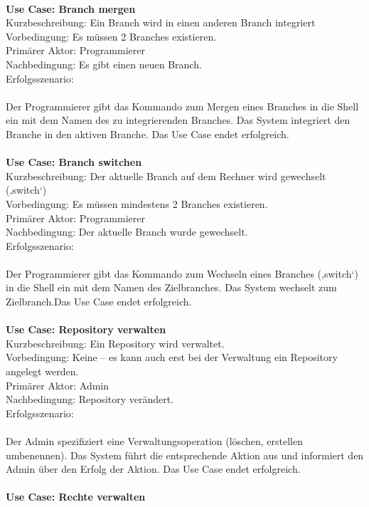 \documentclass[a4paper]{article}
\begin{document}
\\
\textbf{Use Case: 			Branch mergen}\\
Kurzbeschreibung: 	Ein Branch wird in einen anderen Branch integriert\\
Vorbedingung:	Es müssen 2 Branches existieren.\\
Primärer Aktor:	Programmierer\\
Nachbedingung:	Es gibt einen neuen Branch.\\
Erfolgsszenario:\\
\\
Der Programmierer gibt das Kommando zum Mergen eines Branches in die Shell ein mit dem Namen des zu integrierenden Branches. Das System integriert den Branche in den aktiven Branche. Das Use Case endet erfolgreich.\\
\\
\textbf{Use Case: 			Branch switchen}\\
Kurzbeschreibung: 	Der aktuelle Branch auf dem Rechner wird gewechselt (‚switch‘)\\
Vorbedingung:	Es müssen mindestens 2 Branches existieren.\\
Primärer Aktor:	Programmierer\\
Nachbedingung:	Der aktuelle Branch wurde gewechselt.\\
Erfolgsszenario:\\
\\
Der Programmierer gibt das Kommando zum Wechseln eines Branches (‚switch‘) in die Shell ein mit dem Namen des Zielbranches. Das System wechselt zum Zielbranch.Das Use Case endet erfolgreich.\\
\\
\textbf{Use Case: 			Repository verwalten}\\
Kurzbeschreibung: 	Ein Repository wird verwaltet.\\
Vorbedingung:	Keine – es kann auch erst bei der Verwaltung ein Repository angelegt werden.\\
Primärer Aktor:	Admin\\
Nachbedingung:	Repository verändert. \\
Erfolgsszenario:\\
\\
Der Admin spezifiziert eine Verwaltungsoperation (löschen, erstellen umbenennen). Das System führt die entsprechende Aktion aus und informiert den Admin über den Erfolg der Aktion. Das Use Case endet erfolgreich.\\
\\
\textbf{Use Case: 			Rechte verwalten}\\
\end{document}
